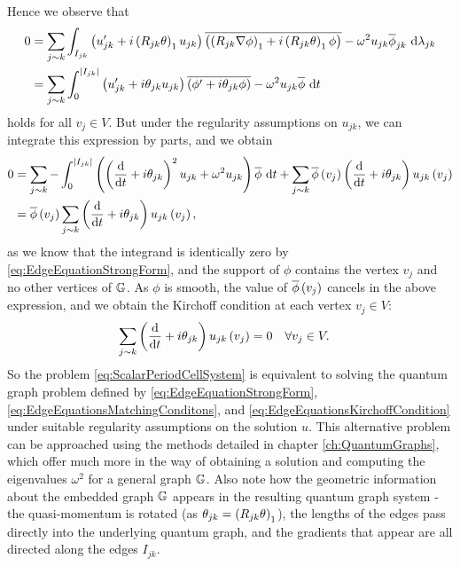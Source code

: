 Hence we observe that
\begin{align*}
	0 &= \sum_{j\sim k}\int_{I_{jk}}\left( u_{jk}' + i\left( R_{jk}\theta \right)_1 u_{jk} \right)\overline{\left( \left( R_{jk}\nabla\phi \right)_1 + i\left( R_{jk}\theta \right)_1 \phi \right)} - \omega^2 u_{jk}\overline{\phi}_{jk} \ \mathrm{d}\lambda_{jk} \\
	&= \sum_{j\sim k}\int_0^{\left\lvert I_{jk} \right\rvert} \left(  u'_{jk} + i\theta_{jk}u_{jk}  \right) \overline{\left(  \phi' + i\theta_{jk}\phi  \right)} - \omega^2 u_{jk}\overline{\phi} \ \mathrm{d} t
\end{align*}
holds for all $v_j\in V$.
But under the regularity assumptions on $u_{jk}$, we can integrate this expression by parts, and we obtain
\begin{align*}
	0 &= \sum_{j\sim k} -\int_0^{\left\lvert I_{jk} \right\rvert} \left( \left( \dfrac{\mathrm{d}}{\mathrm{d}t} + i\theta_{jk} \right)^2 u_{jk} + \omega^2 u_{jk} \right)\overline{\phi} \ \mathrm{d} t 
	+ \sum_{j\sim k}\overline{\phi}\left( v_j \right)\left( \dfrac{\mathrm{d}}{\mathrm{d}t} + i\theta_{jk} \right)u_{jk}\left( v_j \right) \\
	&= \overline{\phi}\left( v_j \right)\sum_{j\sim k}\left( \dfrac{\mathrm{d}}{\mathrm{d}t} + i\theta_{jk} \right)u_{jk}\left( v_j \right),
\end{align*}
as we know that the integrand is identically zero by \eqref{eq:EdgeEquationStrongForm}, and the support of $\phi$ contains the vertex $v_j$ and no other vertices of $\mathbb{G}$.
As $\phi$ is smooth, the value of $\overline{\phi}\left( v_j \right)$ cancels in the above expression, and we obtain the Kirchoff condition at each vertex $v_j\in V$:
\begin{align} \label{eq:EdgeEquationsKirchoffCondition}
	\sum_{j\sim k} \left( \dfrac{\mathrm{d}}{\mathrm{d}t} + i\theta_{jk} \right)u_{jk}\left( v_j \right) &= 0 \quad \forall v_j\in V.
\end{align}
So the problem \eqref{eq:ScalarPeriodCellSystem} is equivalent to solving the quantum graph problem defined by \eqref{eq:EdgeEquationStrongForm}, \eqref{eq:EdgeEquationsMatchingConditons}, and \eqref{eq:EdgeEquationsKirchoffCondition} under suitable regularity assumptions on the solution $u$.
This alternative problem can be approached using the methods detailed in chapter \ref{ch:QuantumGraphs}, which offer much more in the way of obtaining a solution and computing the eigenvalues $\omega^2$ for a general graph $\mathbb{G}$.
Also note how the geometric information about the embedded graph $\mathbb{G}$ appears in the resulting quantum graph system - the quasi-momentum is rotated (as $\theta_{jk} = \left( R_{jk}\theta \right)_1$), the lengths of the edges pass directly into the underlying quantum graph, and the gradients that appear are all directed along the edges $I_{jk}$.


